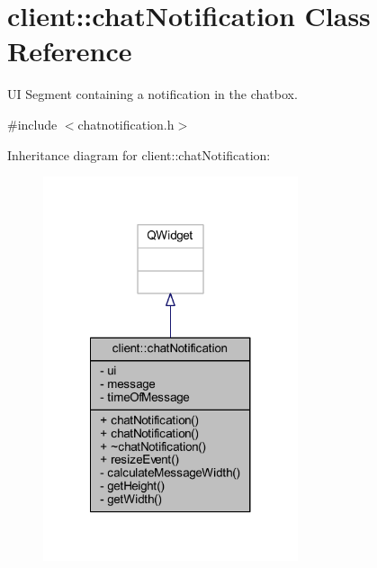\hypertarget{classclient_1_1chat_notification}{\section{client\-:\-:chat\-Notification Class Reference}
\label{d5/d17/classclient_1_1chat_notification}
}


U\-I Segment containing a notification in the chatbox.  




{\ttfamily \#include $<$chatnotification.\-h$>$}



Inheritance diagram for client\-:\-:chat\-Notification\-:\nopagebreak
\begin{figure}[H]
\begin{center}
\leavevmode
\includegraphics[width=212pt]{d4/d6d/classclient_1_1chat_notification__inherit__graph}
\end{center}
\end{figure}


